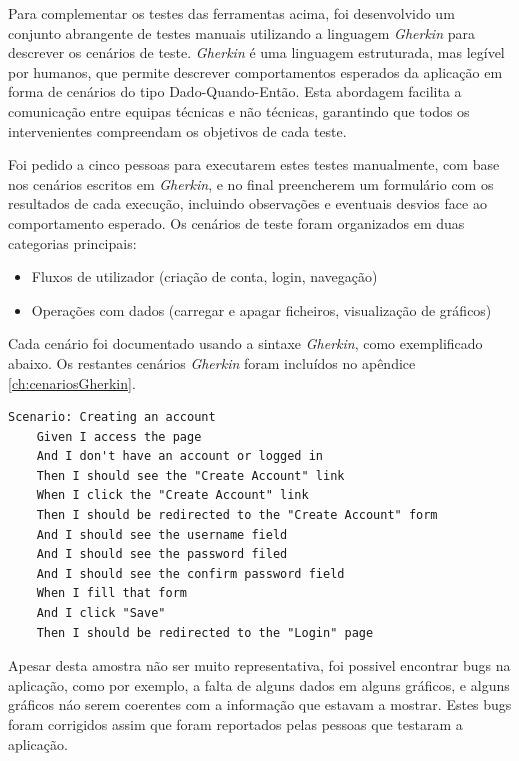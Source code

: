 Para complementar os testes das ferramentas acima, foi desenvolvido um conjunto abrangente de testes manuais utilizando a linguagem \textit{Gherkin} para descrever os cenários de teste. \textit{Gherkin} é uma linguagem estruturada, mas legível por humanos, que permite descrever comportamentos esperados da aplicação em forma de cenários do tipo Dado-Quando-Então. Esta abordagem facilita a comunicação entre equipas técnicas e não técnicas, garantindo que todos os intervenientes compreendam os objetivos de cada teste.

Foi pedido a cinco pessoas para executarem estes testes manualmente, com base nos cenários escritos em \textit{Gherkin}, e no final preencherem um formulário com os resultados de cada execução, incluindo observações e eventuais desvios face ao comportamento esperado. Os cenários de teste foram organizados em duas categorias principais:

\begin{itemize}
    \item Fluxos de utilizador (criação de conta, login, navegação)
    \item Operações com dados (carregar e apagar ficheiros, visualização de gráficos)
\end{itemize}

Cada cenário foi documentado usando a sintaxe \textit{Gherkin}, como exemplificado abaixo. Os restantes cenários \textit{Gherkin} foram incluídos no apêndice \ref{ch:cenariosGherkin}.

\begin{lstlisting}[language=Gherkin, caption={Excerto do código \textit{Gherkin} do cenário de teste para a criação de uma conta}]
Scenario: Creating an account
	Given I access the page 
	And I don't have an account or logged in
	Then I should see the "Create Account" link
	When I click the "Create Account" link
	Then I should be redirected to the "Create Account" form
	And I should see the username field
	And I should see the password filed
	And I should see the confirm password field
	When I fill that form
	And I click "Save"
	Then I should be redirected to the "Login" page
\end{lstlisting}

Apesar desta amostra não ser muito representativa, foi possivel encontrar bugs na aplicação, como por exemplo, a falta de alguns dados em alguns gráficos, e alguns gráficos náo serem coerentes com a informação que estavam a mostrar. Estes bugs foram corrigidos assim que foram reportados pelas pessoas que testaram a aplicação.

